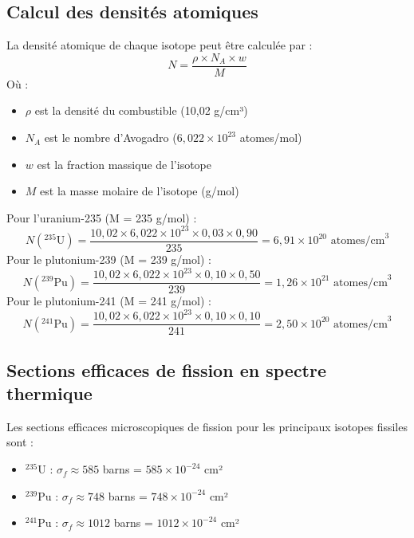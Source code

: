 \documentclass{article}
\begin{document}
\subsection{Calcul des densités atomiques}
La densité atomique de chaque isotope peut être calculée par :
\begin{equation}
  N = \frac{\rho \times N_A \times w}{M}
\end{equation}
Où :
\begin{itemize}
  \item $\rho$ est la densité du combustible (10,02 g/cm³)
  \item $N_A$ est le nombre d'Avogadro ($6,022 \times 10^{23}$ atomes/mol)
  \item $w$ est la fraction massique de l'isotope
  \item $M$ est la masse molaire de l'isotope (g/mol)
\end{itemize}
Pour l'uranium-235 (M = 235 g/mol) :
\begin{equation}
  N(^{235}\text{U}) = \frac{10,02 \times 6,022 \times 10^{23} \times 0,03 \times 0,90}{235} = 6,91 \times 10^{20} \text{ atomes/cm}^3
\end{equation}
Pour le plutonium-239 (M = 239 g/mol) :
\begin{equation}
  N(^{239}\text{Pu}) = \frac{10,02 \times 6,022 \times 10^{23} \times 0,10 \times 0,50}{239} = 1,26 \times 10^{21} \text{ atomes/cm}^3
\end{equation}
Pour le plutonium-241 (M = 241 g/mol) :
\begin{equation}
  N(^{241}\text{Pu}) = \frac{10,02 \times 6,022 \times 10^{23} \times 0,10 \times 0,10}{241} = 2,50 \times 10^{20} \text{ atomes/cm}^3
\end{equation}

\subsection{Sections efficaces de fission en spectre thermique}
Les sections efficaces microscopiques de fission pour les principaux isotopes fissiles sont :
\begin{itemize}
  \item $^{235}$U : $\sigma_f \approx 585$ barns = $585 \times 10^{-24}$ cm²
  \item $^{239}$Pu : $\sigma_f \approx 748$ barns = $748 \times 10^{-24}$ cm²
  \item $^{241}$Pu : $\sigma_f \approx 1012$ barns = $1012 \times 10^{-24}$ cm²
\end{itemize}
\end{document}
